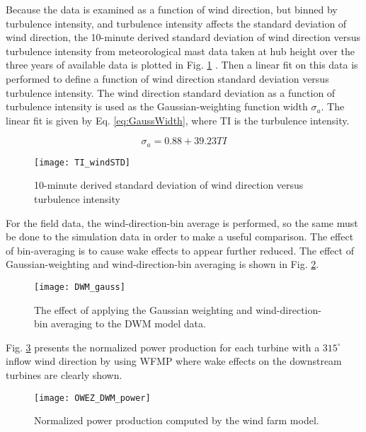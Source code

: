 \documentclass{umthesis}
\begin{document}
Because the data is examined as a function of wind direction, but binned by turbulence intensity, and turbulence intensity affects the standard deviation of wind direction, the 10-minute derived standard deviation of wind direction versus turbulence intensity from meteorological mast data taken at hub height over the three years of available data is plotted in Fig. \ref{fig:TI_windSTD} \cite{dwm_les_owez}. Then a linear fit on this data is performed to define a function of wind direction standard deviation versus turbulence intensity. The wind direction standard deviation as a function of turbulence intensity is used as the Gaussian-weighting function width $\sigma_a$. The linear fit is given by Eq. \ref{eq:GaussWidth}, where TI is the turbulence intensity. 

\begin{equation}\label{eq:GaussWidth}
  \sigma_a=0.88+39.23TI
\end{equation}

\begin{figure}
  \centering
  \texttt{[image: TI\_windSTD]}
  \caption{10-minute derived standard deviation of wind direction versus turbulence intensity}\label{fig:TI_windSTD}
\end{figure}

For the field data, the wind-direction-bin average is performed, so the same must be done to the simulation data in order to make a useful comparison. The effect of bin-averaging is to cause wake effects to appear further reduced. The effect of Gaussian-weighting and wind-direction-bin averaging is shown in Fig. \ref{fig:DWM_gauss}.

\begin{figure}
  \centering
  \texttt{[image: DWM\_gauss]}
  \caption{The effect of applying the Gaussian weighting and wind-direction-bin averaging to the DWM model data.}\label{fig:DWM_gauss}
\end{figure}

Fig. \ref{fig:OWEZ_DWM_power} presents the normalized power production for each turbine with a $315^\circ$ inflow wind direction by using WFMP where wake effects on the downstream turbines are clearly shown.
\begin{figure}
  \centering
  \texttt{[image: OWEZ\_DWM\_power]}
  \caption{Normalized power production computed by the wind farm model.}\label{fig:OWEZ_DWM_power}
\end{figure}
\end{document}
